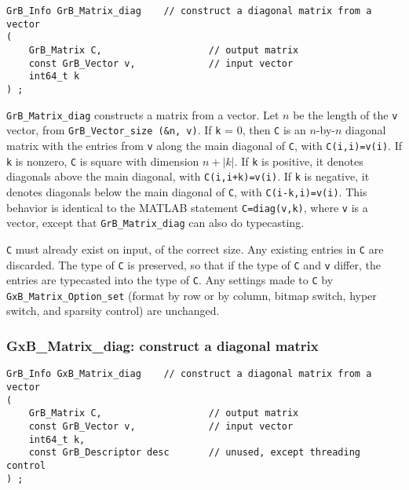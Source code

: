 \documentclass[12pt]{article}
\begin{document}
\begin{mdframed}[userdefinedwidth=6in]
{\footnotesize
\begin{verbatim}
GrB_Info GrB_Matrix_diag    // construct a diagonal matrix from a vector
(
    GrB_Matrix C,                   // output matrix
    const GrB_Vector v,             // input vector
    int64_t k
) ;
\end{verbatim} } \end{mdframed}

\verb'GrB_Matrix_diag' constructs a matrix from a vector.  Let $n$ be the
length of the \verb'v' vector, from \verb'GrB_Vector_size (&n, v)'.  If
\verb'k' = 0, then \verb'C' is an $n$-by-$n$ diagonal matrix with the entries
from \verb'v' along the main diagonal of \verb'C', with \verb'C(i,i)=v(i)'.  If
\verb'k' is nonzero, \verb'C' is square with dimension $n+|k|$.  If \verb'k' is
positive, it denotes diagonals above the main diagonal, with
\verb'C(i,i+k)=v(i)'.
If \verb'k' is negative, it denotes diagonals below the main diagonal of
\verb'C', with \verb'C(i-k,i)=v(i)'.  This behavior is identical to the MATLAB
statement \verb'C=diag(v,k)', where \verb'v' is a vector, except that
\verb'GrB_Matrix_diag' can also do typecasting.

\verb'C' must already exist on input, of the correct size.  Any existing
entries in \verb'C' are discarded.  The type of \verb'C' is preserved, so that
if the type of \verb'C' and \verb'v' differ, the entries are typecasted into
the type of \verb'C'.  Any settings made to \verb'C' by
\verb'GxB_Matrix_Option_set' (format by row or by column, bitmap switch, hyper
switch, and sparsity control) are unchanged.

\subsubsection{{\sf GxB\_Matrix\_diag:} construct a diagonal matrix}
\label{matrix_diag_GxB}

\begin{mdframed}[userdefinedwidth=6in]
{\footnotesize
\begin{verbatim}
GrB_Info GxB_Matrix_diag    // construct a diagonal matrix from a vector
(
    GrB_Matrix C,                   // output matrix
    const GrB_Vector v,             // input vector
    int64_t k,
    const GrB_Descriptor desc       // unused, except threading control
) ;
\end{verbatim} } \end{mdframed}
\end{document}
